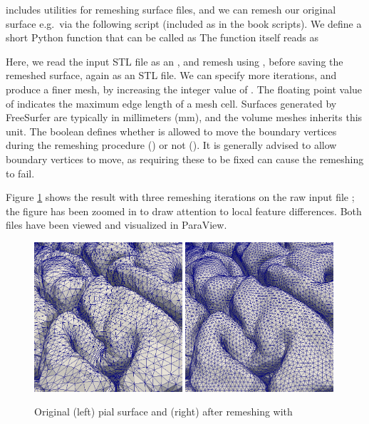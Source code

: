 \svmtk{} includes utilities for remeshing surface files, and we can
remesh our original surface  e.g.~via the
following script (included as  in
the book scripts). We define a short Python function
 that can be called as
\noindent The function itself reads as

\noindent Here, we read the input STL file as an \svmtk{}
, and remesh using
, before saving the remeshed
surface, again as an STL file. We can specify more iterations, and
produce a finer mesh, by increasing the integer value of
. The floating point value of 
indicates the maximum edge length of a mesh cell. Surfaces generated
by FreeSurfer are typically in millimeters (mm), and the volume meshes
inherits this unit. The boolean
 defines whether \svmtk{}
is allowed to move the boundary vertices during the remeshing
procedure () or not (). It is
generally advised to allow boundary vertices to move, as requiring
these to be fixed can cause the remeshing to fail.

Figure \ref{fig:chp3:ernie-remesh} shows the result
 with three remeshing iterations on the raw
input file ; the figure has been zoomed in to draw
attention to local feature differences. Both files have been viewed
and visualized in ParaView.
\begin{figure}
  \centering
  \includegraphics[width=0.49\textwidth]{./chapters/chp3/FIG/raw-stlmesh.png}
  \includegraphics[width=0.49\textwidth]{./chapters/chp3/FIG/remesh-stlmesh.png}
  \caption{Original (left) pial surface and (right) after remeshing with \svmtk{}}
  \label{fig:chp3:ernie-remesh}
\end{figure}


